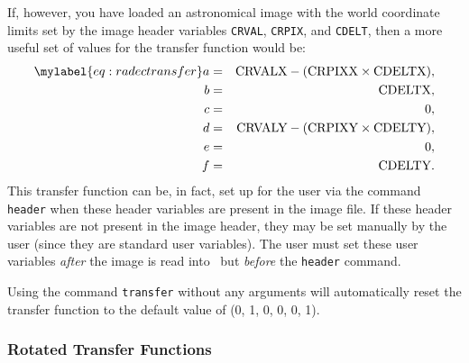 If, however, you have loaded an astronomical image with the world
coordinate limits set by the image header variables {\tt CRVAL},
{\tt CRPIX}, and {\tt CDELT}, then a more useful set of values for
the transfer function would be:
\begin{eqnarray*}
\mylabel{eq:radectransfer}
  a & = & \mbox{CRVALX} - (\mbox{CRPIXX} \times \mbox{CDELTX}), \\
  b & = & \mbox{CDELTX}, \\
  c & = & 0, \\
  d & = & \mbox{CRVALY} - (\mbox{CRPIXY} \times \mbox{CDELTY}), \\
  e & = & 0, \\
  f & = & \mbox{CDELTY}.
\end{eqnarray*}
This transfer function can be, in fact, set up for the user via the command
{\tt header}%
when these header variables are present in the image file.
If these header variables are not present in the image header,
they may be set manually by the user
(since they are standard user variables).
The user must set these user variables {\em after}
the image is read into \wip\ but {\em before} the {\tt header} command.

Using the command {\tt transfer}%
 without any arguments
will automatically reset the transfer function
to the default value of (0, 1, 0, 0, 0, 1).

\subsubsection*		{Rotated Transfer Functions}


